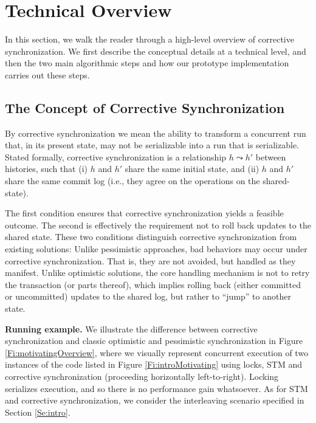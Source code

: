 \section{Technical Overview}

In this section, we walk the reader through a high-level overview of corrective synchronization. We first describe the conceptual details at a technical level, and then the two main algorithmic steps and how our prototype implementation carries out these steps.

\subsection{The Concept of Corrective Synchronization}

By corrective synchronization we mean the ability to transform a concurrent run that, in its present state, may not be serializable into a run that is serializable. Stated formally, corrective synchronization is a relationship $h \leadsto h'$ between histories, such that (i) $h$ and $h'$ share the same initial state, and (ii) $h$ and $h'$ share the same commit log (i.e., they agree on the operations on the shared-state).

The first condition ensures that corrective synchronization yields a feasible outcome. The second is effectively the requirement not to roll back updates to the shared state. These two conditions distinguish corrective synchronization from existing solutions: Unlike pessimistic approaches, bad behaviors may occur under corrective synchronization. That is, they are not avoided, but handled as they manifest. Unlike optimistic solutions, the core handling mechanism is not to retry the transaction (or parts thereof), which implies rolling back (either committed or uncommitted) updates to the shared log, but rather to ``jump'' to another state.

\noindent \textbf{Running example.}
We illustrate the difference between corrective synchronization and classic optimistic and pessimistic synchronization in Figure \ref{Fi:motivatingOverview}, where we visually represent concurrent execution of two instances of the code listed in Figure \ref{Fi:introMotivating} using locks, STM and corrective synchronization (proceeding horizontally left-to-right). Locking serializes execution, and so there is no performance gain whatsoever. As for STM and corrective synchronization, we consider the interleaving scenario specified in Section \ref{Se:intro}. %


